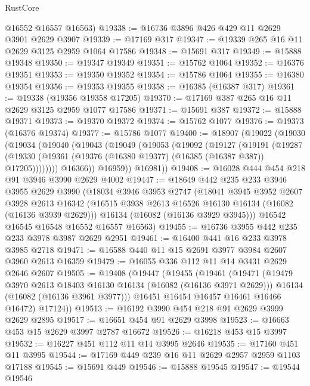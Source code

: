 \begin{lexlean}{RustCore}
\begin{coremodule}
      @16552
      @16557
      @16563)
@19338 := @16736 @3896 @426 @429 @11 @2629 @3901 @2629 @3907
@19339 := @17169 @317
@19347 := @19339 @265 @16 @11 @2629 @3125 @2959 @1064 @17586
@19348 := @15691 @317
@19349 := @15888 @19348
@19350 := @19347 @19349
@19351 := @15762 @1064
@19352 := @16376 @19351
@19353 := @19350 @19352
@19354 := @15786 @1064
@19355 := @16380 @19354
@19356 := @19353 @19355
@19358 := @16385 (@16387 @317)
@19361 := @19338 (@19356 @19358 @17205)
@19370 := @17169 @387 @265 @16 @11 @2629 @3125 @2959 @1077 @17586
@19371 := @15691 @387
@19372 := @15888 @19371
@19373 := @19370 @19372
@19374 := @15762 @1077
@19376 := @19373 (@16376 @19374)
@19377 := @15786 @1077
@19400 := @18907
    (@19022
      (@19030
        (@19034
          (@19040
            (@19043
              (@19049
                (@19053
                  (@19092
                    (@19127
                      (@19191
                        (@19287
                          (@19330
                            (@19361 (@19376 (@16380 @19377) (@16385 (@16387 @387)) @17205))))))))
                @16366))
            @16959))
        @16981))
@19408 := @16028 @444 @454 @218 @91 @3946 @3990 @2629 @4002
@19447 := @18649
    @442
    @235
    @233
    @3946
    @3955
    @2629
    @3990
    (@18034
      @3946
      @3953
      @2747
      (@18041
        @3945
        @3952
        @2607
        @3928
        @2613
        @16342
        (@16515 @3938 @2613 @16526 @16130 @16134 (@16082 (@16136 @3939 @2629)))
        @16134
        (@16082 (@16136 @3929 @3945)))
      @16542
      @16545
      @16548
      @16552
      @16557
      @16563)
@19455 := @16736 @3955 @442 @235 @233 @3978 @3987 @2629 @2951
@19461 := @16400 @441 @16 @233 @3978 @3985 @2718
@19471 := @16588 @440 @11 @15 @2691 @3977 @3984 @2607 @3960 @2613 @16359
@19479 := @16055 @336 @112 @11 @14 @3431 @2629 @2646 @2607
@19505 := @19408
    (@19447
      (@19455
        (@19461
          (@19471
            (@19479 @3970 @2613 @18403 @16130 @16134 (@16082 (@16136 @3971 @2629)))
            @16134
            (@16082 (@16136 @3961 @3977)))
          @16451
          @16454
          @16457
          @16461
          @16466
          @16472)
        @17124))
@19513 := @16192 @3990 @454 @218 @91 @2629 @3999 @2629 @2895
@19517 := @16651 @454 @91 @2629 @3998
@19523 := @16663 @453 @15 @2629 @3997 @2787 @16672
@19526 := @16218 @453 @15 @3997
@19532 := @16227 @451 @112 @11 @14 @3995 @2646
@19535 := @17160 @451 @11 @3995
@19544 := @17169 @449 @239 @16 @11 @2629 @2957 @2959 @1103 @17188
@19545 := @15691 @449
@19546 := @15888 @19545
@19547 := @19544 @19546

\end{coremodule}
\end{lexlean}
